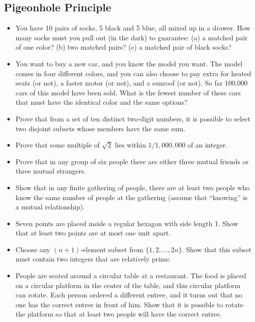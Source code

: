 \documentclass[12pt]{article}
\begin{document}
\subsection{Pigeonhole Principle}
\begin{itemize}
  \item You have 10 pairs of socks, 5 black and 5 blue, all mixed up in a drawer. How many socks must you pull out (in the dark) to guarantee: (a) a matched pair of one color? (b) two matched pairs? (c) a matched pair of black socks?

  \item You want to buy a new car, and you know the model you want. The model comes in four different colors, and you can also choose to pay extra for heated seats (or not), a faster motor (or not), and a sunroof (or not). So far 100,000 cars of this model have been sold. What is the fewest number of these cars that must have the identical color and the same options?

  \item Prove that from a set of ten distinct two-digit numbers, it is possible to select two disjoint subsets whose members have the same sum.

  \item Prove that some multiple of $\sqrt{2}$ lies within $1/1{,}000{,}000$ of an integer.

  \item Prove that in any group of six people there are either three mutual friends or three mutual strangers.

  \item Show that in any finite gathering of people, there are at least two people who know the same number of people at the gathering (assume that ``knowing'' is a mutual relationship).

  \item Seven points are placed inside a regular hexagon with side length 1. Show that at least two points are at most one unit apart.

  \item Choose any $(n + 1)$-element subset from $\{1, 2, \ldots, 2n\}$. Show that this subset must contain two integers that are relatively prime.

  \item People are seated around a circular table at a restaurant. The food is placed on a circular platform in the center of the table, and this circular platform can rotate. Each person ordered a different entree, and it turns out that no one has the correct entree in front of him. Show that it is possible to rotate the platform so that at least two people will have the correct entree.


\end{itemize}
\end{document}
